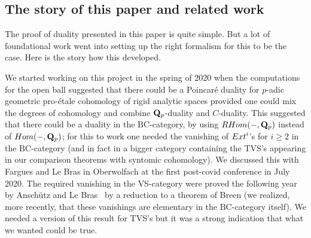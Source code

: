 \documentclass[10pt,reqno]{amsart}
\theoremstyle{definition}
\newtheorem{remark}[equation]{Remark}
\theoremstyle{remark}
\numberwithin{equation}{section}
\def\Q{{\bf Q}} \def\Z{{\bf Z}}
\numberwithin{equation}{section}
\begin{document}

\subsection{The story of this paper and related work}  
 The proof of duality presented in this paper is quite simple.
 But a lot of foundational work went into setting up the right formalism for this to be the case.
 Here is the story how this developed. 

We started working on this project in the spring of 2020 when the computations for the open ball suggested
that there could be a Poincar\'e duality for $p$-adic geometric pro-\'etale cohomology
of rigid analytic spaces provided one could mix
the degrees of cohomology and combine $\Q_p$-duality and $C$-duality.
  This suggested that there could
be a duality in the $\mathrm{BC}$-category, by using ${\rm RHom}(-,\Q_p)$ instead of ${\rm Hom}(-,\Q_p)$; for this to
work one needed the vanishing of ${\rm Ext}^i$'s for $i\geq 2$ in the $\mathrm{BC}$-category (and in fact in
a bigger category containing the {\rm TVS}'s appearing in our comparison theorems with syntomic cohomology).
We discussed  this with Fargues and Le Bras in Oberwolfach at the first post-covid conference in
July 2020.
  The required  vanishing in the {\rm VS}-category were proved the following year  by Ansch\"utz and Le Bras~\cite{ALB}
 by a reduction to a theorem of  Breen
(we realized, more recently, that these vanishings are elementary in the $ \mathrm{BC}$-category itself).
 We needed a version of this result for {\rm TVS}'s but it was a strong indication that what we wanted could be true. 
\end{document}

